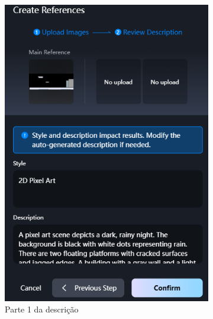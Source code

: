 \begin{figure}[htbp]
    \centering
    \caption{\small Tela da criação da referência da cena do tutorial no Vidu}
    \label{fig:viduReferenciaTutorial}
    \begin{subfigure}{0.4\linewidth}
        \includegraphics[width=1\linewidth]{figs/vidu/tela_referencia_tutorial.PNG}
        \caption{\small Parte 1 da descrição}
        \label{fig:viduReferenciaTutorial1}
    \end{subfigure}
    \begin{subfigure}{0.4\linewidth}

\end{subfigure}
\end{figure}
